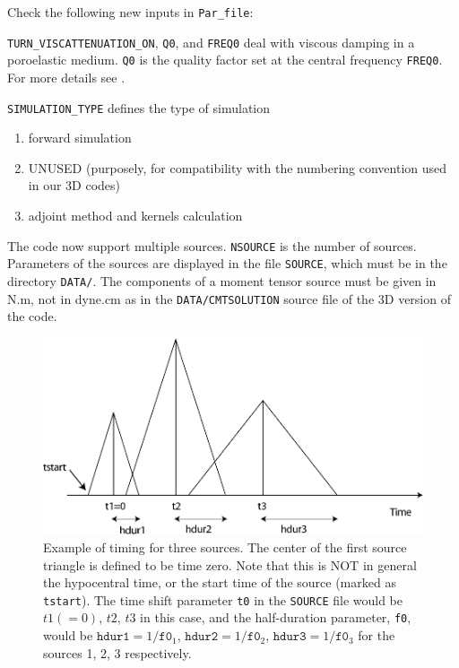 Check the following new inputs in \texttt{Par\_file}:
%
\begin{description}[style=nextline, labelindent=1em, font=\normalfont]
\item[In section \textbf{"\# geometry of model and mesh description"}:]
\texttt{TURN\_VISCATTENUATION\_ON}, \texttt{Q0}, and \texttt{FREQ0} deal with viscous damping in a poroelastic medium.
\texttt{Q0} is the quality factor set at the central frequency \texttt{FREQ0}. For more details
see \cite{MoTr08}.

\item[In section \textbf{"\# time step parameters"}:]
\texttt{SIMULATION\_TYPE} defines the type of simulation
  \begin{enumerate}[label=(\arabic*)]
    \item forward simulation
    \item UNUSED (purposely, for compatibility with the numbering convention used in our 3D codes)
    \item adjoint method and kernels calculation
  \end{enumerate}

\item[In section \textbf{"\# source parameters"}:]
The code now support multiple sources.
\texttt{NSOURCE} is the number of sources.
Parameters of the sources are displayed in the file \texttt{SOURCE}, which must be
in the directory \texttt{DATA/}. The components of a moment tensor source must be given in N.m,
not in dyne.cm as in the \texttt{DATA/CMTSOLUTION} source file of the 3D version of the code.
\begin{figure}[htbp]
\centering
\includegraphics[width=5in]{figures/source_timing.pdf}
\caption{Example of timing for three sources. The center of the first source
triangle is defined to be time zero. Note that this is NOT in general
the hypocentral time, or the start time of the source (marked as \texttt{tstart}).
The time shift parameter \texttt{t0} in the \texttt{SOURCE} file
would be $t1(=0)$, $t2$, $t3$ in this case, and the half-duration parameter, \texttt{f0},
would be $\mathtt{hdur1}=1/\mathtt{f0}_1$, $\mathtt{hdur2}=1/\mathtt{f0}_2$,
$\mathtt{hdur3}=1/\mathtt{f0}_3$ for the sources 1, 2, 3 respectively.}
\label{fig:source_timing}
\end{figure}



\end{description}
